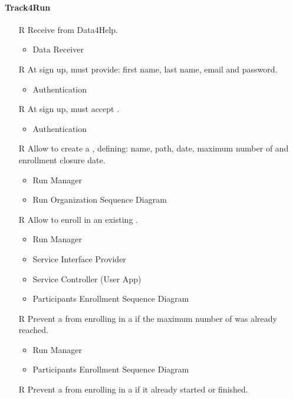 \paragraph{Track4Run}
\begin{itemize}
	\item[R\subs{40}]Receive  from Data4Help.
	\begin{itemize}
		\item Data Receiver
	\end{itemize}
	\item[R\subs{41}]At sign up,  must provide: first name, last name, email and password.
	\begin{itemize}
		\item Authentication
	\end{itemize}
	\item[R\subs{42}]At sign up,  must accept .
	\begin{itemize}
		\item Authentication
	\end{itemize}
	\item[R\subs{43}]Allow  to create a , defining: name, path, date, maximum number of  and enrollment closure date.
	\begin{itemize}
		\item Run Manager
		\item Run Organization Sequence Diagram
	\end{itemize}
	\item[R\subs{44}]Allow  to enroll in an existing .
	\begin{itemize}
		\item Run Manager
		\item Service Interface Provider
		\item Service Controller (User App)
		\item Participants Enrollment Sequence Diagram
	\end{itemize}
	\item[R\subs{45}]Prevent a  from enrolling in a  if the maximum number of  was already reached.
	\begin{itemize}
		\item Run Manager
		\item Participants Enrollment Sequence Diagram
	\end{itemize}
	\item[R\subs{46}]Prevent a  from enrolling in a  if it already started or finished.

\end{itemize}

